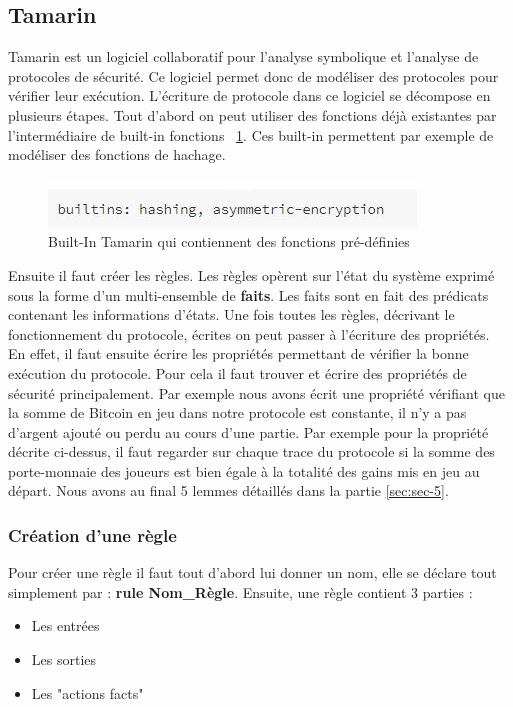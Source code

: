 \documentclass[conference]{IEEEtran}
\begin{document}
\subsection{Tamarin}

Tamarin est un logiciel collaboratif pour l'analyse symbolique et l'analyse de protocoles de sécurité. Ce logiciel permet donc de modéliser des protocoles pour vérifier leur exécution. L'écriture de protocole dans ce logiciel se décompose en plusieurs étapes. Tout d'abord on peut utiliser des fonctions déjà existantes par l'intermédiaire de built-in fonctions ~\ref{B-I}. Ces built-in permettent par exemple de modéliser des fonctions de hachage. \\

\begin{center}
\begin{figure}[!h]
\centering
\includegraphics[scale=0.6]{BuiltIn.JPG}
\caption{Built-In Tamarin qui contiennent des fonctions pré-définies}
\label{B-I}
\end{figure}
\end{center}

Ensuite il faut créer les règles. Les règles opèrent sur l'état du système exprimé sous la forme d'un multi-ensemble de \textbf{faits}. Les faits sont en fait des prédicats contenant les informations d'états. Une fois toutes les règles, décrivant le fonctionnement du protocole, écrites on peut passer à l'écriture des propriétés. \\ 
En effet, il faut ensuite écrire les propriétés permettant de vérifier la bonne exécution du protocole. Pour cela il faut trouver et écrire des propriétés de sécurité principalement. Par exemple nous avons écrit une propriété vérifiant que la somme de Bitcoin en jeu dans notre protocole est constante, il n'y a pas d'argent ajouté ou perdu au cours d'une partie. Par exemple pour la propriété décrite ci-dessus, il faut regarder sur chaque trace du protocole si la somme des porte-monnaie des joueurs est bien égale à la totalité des gains mis en jeu au départ. Nous avons au final 5 lemmes détaillés dans la partie \ref{sec:sec-5}. \\


\subsubsection{Création d'une règle} 
Pour créer une règle il faut tout d'abord lui donner un nom, elle se déclare tout simplement par : \textbf{rule Nom\_Règle}. Ensuite, une règle contient 3 parties : 
\begin{itemize}
    \item Les entrées
    \item Les sorties
    \item Les "actions facts" \\
\end{itemize}
\end{document}
